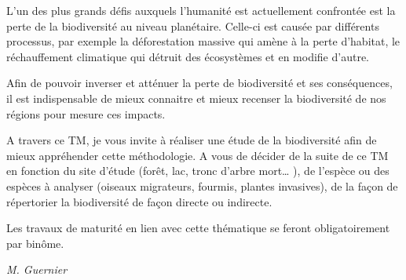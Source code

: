 \documentclass[
  10pt,
  french,
  a5paper,
  openany]{book}
\newenvironment{signature}{\begin{flushright}}{\end{flushright}}
\begin{document}
L'un des plus grands défis auxquels l'humanité est actuellement confrontée est la perte de la biodiversité au niveau planétaire. Celle-ci est causée par différents processus, par exemple la déforestation massive qui amène à la perte d'habitat, le réchauffement climatique qui détruit des écosystèmes et en modifie d'autre.

Afin de pouvoir inverser et atténuer la perte de biodiversité et ses conséquences, il est indispensable de mieux connaitre et mieux recenser la biodiversité de nos régions pour mesure ces impacts.

A travers ce TM, je vous invite à réaliser une étude de la biodiversité afin de mieux appréhender cette méthodologie. A vous de décider de la suite de ce TM en fonction du site d'étude (forêt, lac, tronc d'arbre mort\ldots{} ), de l'espèce ou des espèces à analyser (oiseaux migrateurs, fourmis, plantes invasives), de la façon de répertorier la biodiversité de façon directe ou indirecte.

Les travaux de maturité en lien avec cette thématique se feront obligatoirement par binôme.

\begin{signature}
\emph{M. Guernier}

\end{signature}
\end{document}
